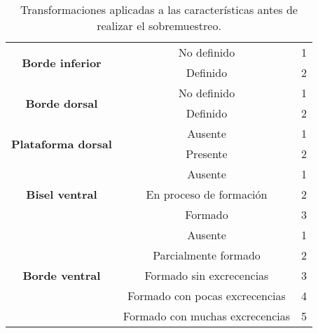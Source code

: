 \begin{table}[H]
{\begin{tabular}{|c|c|c|}
\multirow{2}{*}{\textbf{Borde inferior}}              & No definido                     & 1                                \\ \cline{2-3}
                                                      & Definido                        & 2                                \\ \hline
\multirow{2}{*}{\textbf{Borde dorsal}}                & No definido                     & 1                                \\ \cline{2-3}
                                                      & Definido                        & 2                                \\ \hline
\multirow{2}{*}{\textbf{Plataforma dorsal}}           & Ausente                         & 1                                \\ \cline{2-3}
                                                      & Presente                        & 2                                \\ \hline
\multirow{3}{*}{\textbf{Bisel ventral}}               & Ausente                         & 1                                \\ \cline{2-3}
                                                      & En proceso de formación         & 2                                \\ \cline{2-3}
                                                      & Formado                         & 3                                \\ \hline
\multirow{5}{*}{\textbf{Borde ventral}}               & Ausente                         & 1                                \\ \cline{2-3}
                                                      & Parcialmente formado            & 2                                \\ \cline{2-3}
                                                      & Formado sin excrecencias        & 3                                \\ \cline{2-3}
                                                      & Formado con pocas excrecencias  & 4                                \\ \cline{2-3}
                                                      & Formado con muchas excrecencias & 5                                \\ \hline
\end{tabular}%
}
\caption{Transformaciones aplicadas a las características antes de realizar el sobremuestreo.}\label{table:transformaciones_numericas}

\end{table}


